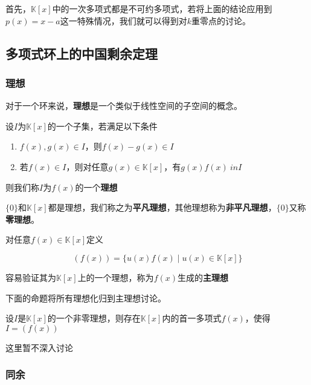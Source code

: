 \documentclass{ctexart}
\begin{document}
首先，$\mathbb {K}[x]$中的一次多项式都是不可约多项式，若将上面的结论应用到$p(x) = x - a$这一特殊情况，我们就可以得到对$k$重零点的讨论。

\subsection{多项式环上的中国剩余定理}

\subsubsection{理想}

对于一个环来说，\textbf{理想}是一个类似于线性空间的子空间的概念。

\begin{definition}
    设$I$为$\mathbb{K}[x]$的一个子集，若满足以下条件
    \begin{enumerate}
        \item $f(x),g(x) \in I$，则$f(x) - g(x) \in I$
        \item 若$f(x) \in I$，则对任意$g(x) \in \mathbb{K}[x]$，有$g(x)f(x) \ in I$
    \end{enumerate}

    则我们称$I$为$f(x)$的一个\textbf{理想}
\end{definition}

$\{0\}$和$\mathbb{K}[x]$都是理想，我们称之为\textbf{平凡理想}，其他理想称为\textbf{非平凡理想}，$\{0\}$又称\textbf{零理想}。

\begin{definition}
    对任意$f(x)\in \mathbb{K}[x]$定义

    \begin{equation*}
        (f(x)) = \{u(x)f(x) \mid u(x) \in \mathbb{K}[x]\}
    \end{equation*}

    容易验证其为$\mathbb{K}[x]$上的一个理想，称为$f(x)$生成的\textbf{主理想}
\end{definition}

下面的命题将所有理想化归到主理想讨论。

\begin{theorem}
    设$I$是$\mathbb{K}[x]$的一个非零理想，则存在$\mathbb{K}[x]$内的首一多项式$f(x)$，使得$I = (f(x))$
\end{theorem}

这里暂不深入讨论

\subsubsection{同余}
\end{document}
